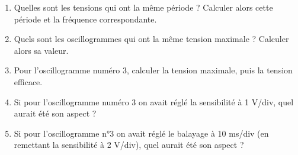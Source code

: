\documentclass[11pt,a4paper]{article}
\begin{document}
\begin{enumerate}
\item Quelles sont les tensions qui ont la même période ? Calculer alors cette période et la fréquence correspondante.

\vspace{3cm}

\item Quels sont les oscillogrammes qui ont la même tension maximale ? Calculer alors sa valeur.

\vspace{3cm}

\item Pour l'oscillogramme numéro 3, calculer la tension maximale, puis la tension efficace.

\vspace{3cm}

\end{enumerate}

\begin{minipage}[t]{0.48\textwidth}
\begin{enumerate}
\setcounter{enumi}{3}
\item Si pour l'oscillogramme numéro 3 on avait réglé la sensibilité à 1 V/div, quel aurait été son aspect ?

\vspace{0.3cm}

\begin{center}
\osci[%
scale=0.75,
second channel=0,
screen offset one=0,
time div=5,
voltage div one=1,
sample rate=200,
xy mode=0,
func one=0,
color one=009900,
graph back color=FFFFFF,
info back color=D6D6D6,
info text color=000000,
main axis color=000000,
grid color=CCCCCC
]
\end{center}
\end{enumerate}
\end{minipage}
\hfill
\begin{minipage}[t]{0.48\textwidth}
\begin{enumerate}
\setcounter{enumi}{4}
\item Si pour l'oscillogramme n°3 on avait réglé le balayage à 10 ms/div (en remettant la sensibilité à 2 V/div), quel aurait été son aspect ?

\vspace{0.3cm}

\begin{center}
\osci[%
scale=0.75,
second channel=0,
screen offset one=0,
time div=10,
voltage div one=2,
sample rate=200,
xy mode=0,
func one=0,
color one=009900,
graph back color=FFFFFF,
info back color=D6D6D6,
info text color=000000,
main axis color=000000,
grid color=CCCCCC
]
\end{center}
\end{enumerate}
\end{minipage}
\end{document}

